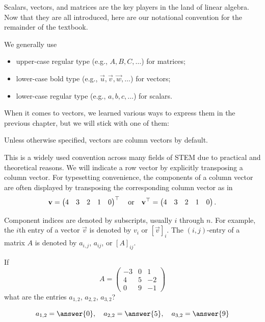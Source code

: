 \documentclass{ximera}
\begin{document}
\begin{concept}[Notation.]
  Scalars, vectors, and matrices are the key players in the land of
  linear algebra. Now that they are all introduced, here are our
  notational convention for the remainder of the textbook.

  We generally use
  \begin{itemize}
  \item upper-case regular type (e.g., $A, B, C, \ldots$) for matrices;
  \item lower-case bold type (e.g., $\vec{u}, \vec{v}, \vec{w}, \ldots$)
    for vectors;
  \item lower-case regular type (e.g., $a, b, c, \ldots$) for scalars.
  \end{itemize}

  When it comes to vectors, we learned various ways to express them in
  the previous chapter, but we will stick with one of them:

  \begin{center}
    Unless otherwise specified, vectors are column vectors by default.
  \end{center}

  This is a widely used convention across many fields of STEM due to
  practical and theoretical reasons. We will indicate a row vector by
  explicitly transposing a column vector. For typesetting convenience,
  the components of a column vector are often displayed by transposing
  the corresponding column vector as in
  \[
    \mathbf{v} =
    \begin{pmatrix}
      4 & 3 & 2 & 1 & 0
    \end{pmatrix}^\top
    \quad\text{or}\quad
    \mathbf{v}^\top =
    \begin{pmatrix}
      4 & 3 & 2 & 1 & 0
    \end{pmatrix}.
  \]

  Component indices are denoted by subscripts, usually $i$ through
  $n$. For example, the $i$th entry of a vector $\vec{v}$ is denoted
  by $v_i$ or $\left[ \vec{v} \right]_i$. The $(i,j)$-entry of a
  matrix $A$ is denoted by $a_{i,j}$, $a_{ij}$, or
  $\left[ A \right]_{ij}$.
\end{concept}


\begin{question}
  If
  \[A= \begin{pmatrix}
    -3 & 0 & 1\\
    4 & 5 & -2\\
    0 & 9 & -1
  \end{pmatrix}
\]
what are the entries $a_{1,2}$, $a_{2,2}$, $a_{3,2}$?
\begin{prompt}
  \[
    a_{1,2} = \answer{0}, \quad a_{2,2} = \answer{5}, \quad a_{3,2} = \answer{9}
  \]
\end{prompt}
\end{question}
\end{document}
